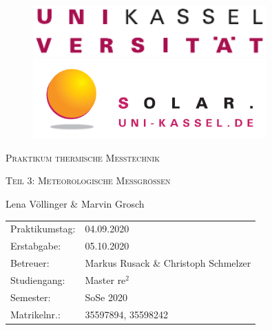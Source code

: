 \documentclass[11pt,a4paper,toc=listof,toc=bibliography]{scrartcl}
\begin{document}
\begin{titlepage}
	
	\begin{figure}[H]
		\begin{minipage}{0.5\textwidth}
			\centering
			\includegraphics[width=0.8\textwidth]{../DATA/Logo_Uni-Kassel.pdf}
		\end{minipage}\hfill
		\begin{minipage}{0.5\textwidth}
			\centering
			\includegraphics[width=0.8\textwidth]{../DATA/Logo_solar.png}
		\end{minipage}
	\end{figure}
	
		\vspace{3cm}
	
	\centering
	{\scshape\LARGE Praktikum thermische Messtechnik\par}   %
	\vspace{1cm}
	{\scshape\Large Teil 3: Meteorologische Messgrößen \par}
	\vspace{1.5cm}
	\vspace{2cm}
	{\Large Lena Völlinger \& Marvin Grosch\par}
	\vfill
	
	\begin{large}
		\begin{tabular}{l l}
			
			Praktikumstag: & 04.09.2020 \\
			Erstabgabe: & 05.10.2020\\
			Betreuer: & Markus Rusack \& Christoph Schmelzer\\
			Studiengang: & Master $\text{re}^2$\\
			Semester: & SoSe 2020\\
			Matrikelnr.: & 35597894, 35598242\\ 
		\end{tabular}
	\end{large}

\end{titlepage}
\end{document}
